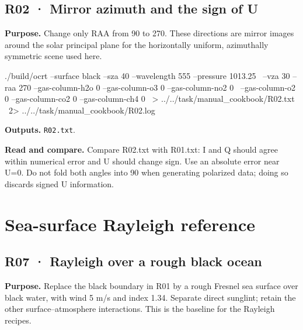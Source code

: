 \clearpage

\subsection{R02 · Mirror azimuth and the sign of U}
\label{sec:auto:09_cookbook:2.2}

\label{recipe:R02}

\textbf{Purpose. }Change only RAA from 90\textdegree{} to 270\textdegree{}. These directions are mirror images around the solar principal plane for the horizontally uniform, azimuthally symmetric scene used here.

\noindent\begin{minipage}{\linewidth}
\begin{ManualCode}

./build/ocrt --surface black --sza 40 --wavelength 555 --pressure 1013.25 \
  --vza 30 --raa 270 --gas-column-h2o 0 --gas-column-o3 0 --gas-column-no2 0 \
  --gas-column-o2 0 --gas-column-co2 0 --gas-column-ch4 0 \
  > ../../task/manual_cookbook/R02.txt \
  2> ../../task/manual_cookbook/R02.log

\end{ManualCode}
\end{minipage}\par

\textbf{Outputs. }\texttt{R02.txt}.

\textbf{Read and compare. }Compare R02.txt with R01.txt: I and Q should agree within numerical error and U should change sign. Use an absolute error near U=0. Do not fold both angles into 90\textdegree{} when generating polarized data; doing so discards signed U information.

\clearpage

\section{Sea-surface Rayleigh reference}

\label{sec:auto:09_cookbook:3}

\label{sec:cookbook_group:rayleigh}

\subsection{R07 · Rayleigh over a rough black ocean}
\label{sec:auto:09_cookbook:3.1}

\label{recipe:R07}

\textbf{Purpose. }Replace the black boundary in R01 by a rough Fresnel sea surface over black water, with wind 5 m/s and index 1.34. Separate direct sunglint; retain the other surface–atmosphere interactions. This is the baseline for the Rayleigh recipes.


